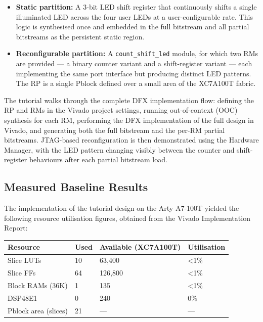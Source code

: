 \begin{itemize}
  \item \textbf{Static partition:} A 3-bit LED shift register that continuously shifts a single illuminated LED across the four user LEDs at a user-configurable rate. This logic is synthesised once and embedded in the full bitstream and all partial bitstreams as the persistent static region.
  \item \textbf{Reconfigurable partition:} A \texttt{count\_shift\_led} module, for which two RMs are provided — a binary counter variant and a shift-register variant — each implementing the same port interface but producing distinct LED patterns. The RP is a single Pblock defined over a small area of the XC7A100T fabric.
\end{itemize}
The tutorial walks through the complete DFX implementation flow: defining the RP and RMs in the Vivado project settings, running out-of-context (OOC) synthesis for each RM, performing the DFX implementation of the full design in Vivado, and generating both the full bitstream and the per-RM partial bitstreams. JTAG-based reconfiguration is then demonstrated using the Hardware Manager, with the LED pattern changing visibly between the counter and shift-register behaviours after each partial bitstream load.

\subsection{Measured Baseline Results}

The implementation of the tutorial design on the Arty A7-100T yielded the following resource utilisation figures, obtained from the Vivado Implementation Report:

\begin{table}[htbp]
\centering
\begin{tabularx}{\textwidth}{X X X X}
\toprule
Resource & Used & Available (XC7A100T) & Utilisation \\
\midrule
Slice LUTs & 10 & 63,400 & \textless{}1\% \\
Slice FFs & 64 & 126,800 & \textless{}1\% \\
Block RAMs (36K) & 1 & 135 & \textless{}1\% \\
DSP48E1 & 0 & 240 & 0\% \\
Pblock area (slices) & 21 & — & — \\
\bottomrule
\end{tabularx}
\end{table}

